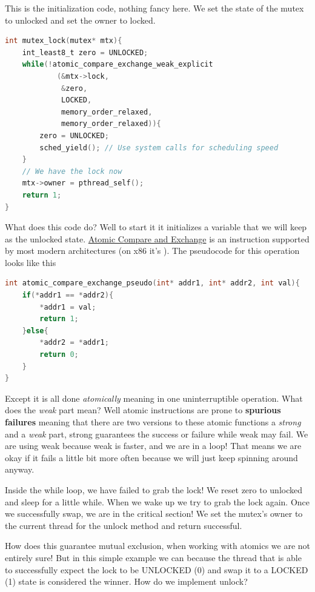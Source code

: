 This is the initialization code, nothing fancy here.
We set the state of the mutex to unlocked and set the owner to locked.

\begin{lstlisting}[language=C]
int mutex_lock(mutex* mtx){
    int_least8_t zero = UNLOCKED;
    while(!atomic_compare_exchange_weak_explicit
            (&mtx->lock, 
             &zero, 
             LOCKED,
             memory_order_relaxed,
             memory_order_relaxed)){
        zero = UNLOCKED;
        sched_yield(); // Use system calls for scheduling speed
    }
    // We have the lock now
    mtx->owner = pthread_self();
    return 1;
}
\end{lstlisting}

What does this code do? Well to start it it initializes a variable that we will keep as the unlocked state.
\href{https://en.wikipedia.org/wiki/Compare-and-swap}{Atomic Compare and Exchange} is an instruction supported by most modern architectures (on x86 it's ).
The pseudocode for this operation looks like this

\begin{lstlisting}[language=C]
int atomic_compare_exchange_pseudo(int* addr1, int* addr2, int val){
    if(*addr1 == *addr2){
        *addr1 = val;
        return 1;
    }else{
        *addr2 = *addr1;
        return 0;
    }
}
\end{lstlisting}

Except it is all done \emph{atomically} meaning in one uninterruptible operation.
What does the \emph{weak} part mean?
Well atomic instructions are prone to \textbf{spurious failures} meaning that there are two versions to these atomic functions a \emph{strong} and a \emph{weak} part, strong guarantees the success or failure while weak may fail.
We are using weak because weak is faster, and we are in a loop!
That means we are okay if it fails a little bit more often because we will just keep spinning around anyway.

Inside the while loop, we have failed to grab the lock!
We reset zero to unlocked and sleep for a little while.
When we wake up we try to grab the lock again.
Once we successfully swap, we are in the critical section!
We set the mutex's owner to the current thread for the unlock method and return successful.

How does this guarantee mutual exclusion, when working with atomics we are not entirely sure!
But in this simple example we can because the thread that is able to successfully expect the lock to be UNLOCKED (0) and swap it to a LOCKED (1) state is considered the winner.
How do we implement unlock?


